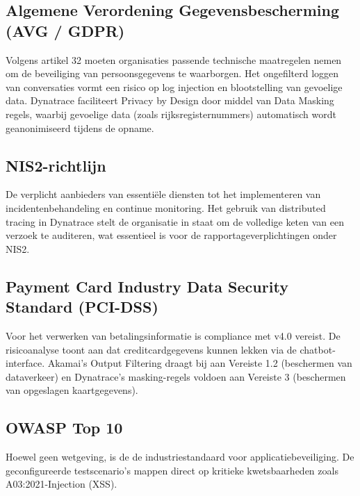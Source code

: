 \subsection{Algemene Verordening Gegevensbescherming (AVG / GDPR)}

Volgens \textcite{gdpr2016} artikel 32 moeten organisaties passende technische maatregelen nemen om de beveiliging van persoonsgegevens te waarborgen. Het ongefilterd loggen van conversaties vormt een risico op log injection en blootstelling van gevoelige data. Dynatrace faciliteert Privacy by Design door middel van Data Masking regels, waarbij gevoelige data (zoals rijksregisternummers) automatisch wordt geanonimiseerd tijdens de opname.

\subsection{NIS2-richtlijn}

De \textcite{nis2} verplicht aanbieders van essentiële diensten tot het implementeren van incidentenbehandeling en continue monitoring. Het gebruik van distributed tracing in Dynatrace stelt de organisatie in staat om de volledige keten van een verzoek te auditeren, wat essentieel is voor de rapportageverplichtingen onder NIS2.

\subsection{Payment Card Industry Data Security Standard (PCI-DSS)}

Voor het verwerken van betalingsinformatie is compliance met \textcite{pcidss4} v4.0 vereist. De risicoanalyse toont aan dat creditcardgegevens kunnen lekken via de chatbot-interface. Akamai's Output Filtering draagt bij aan Vereiste 1.2 (beschermen van dataverkeer) en Dynatrace's masking-regels voldoen aan Vereiste 3 (beschermen van opgeslagen kaartgegevens).

\subsection{OWASP Top 10}

Hoewel geen wetgeving, is de \textcite{owasp2021} de industriestandaard voor applicatiebeveiliging. De geconfigureerde testscenario's mappen direct op kritieke kwetsbaarheden zoals A03:2021-Injection (XSS).